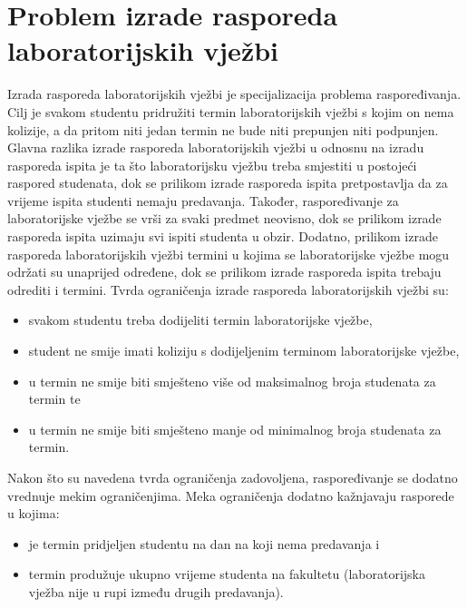 \documentclass[times, utf8, zavrsni]{fer}
\begin{document}
\chapter{Problem izrade rasporeda laboratorijskih vježbi}
Izrada rasporeda laboratorijskih vježbi je specijalizacija problema raspoređivanja. Cilj je svakom studentu pridružiti termin laboratorijskih
vježbi s kojim on nema kolizije, a da pritom niti jedan termin ne bude niti prepunjen niti podpunjen. Glavna razlika izrade rasporeda laboratorijskih
vježbi u odnosnu na izradu rasporeda ispita je ta što laboratorijsku vježbu treba smjestiti u postojeći raspored studenata, dok se prilikom
izrade rasporeda ispita pretpostavlja da za vrijeme ispita studenti nemaju predavanja. Također, raspoređivanje za laboratorijske vježbe se
vrši za svaki predmet neovisno, dok se prilikom izrade rasporeda ispita uzimaju svi ispiti studenta u obzir. Dodatno, prilikom izrade rasporeda
laboratorijskih vježbi termini u kojima se laboratorijske vježbe mogu održati su unaprijed određene, dok se prilikom izrade rasporeda ispita
trebaju odrediti i termini.
Tvrda ograničenja izrade rasporeda laboratorijskih vježbi su:
\begin{itemize}
  \item svakom studentu treba dodijeliti termin laboratorijske vježbe,
  \item student ne smije imati koliziju s dodijeljenim terminom laboratorijske vježbe,
  \item u termin ne smije biti smješteno više od maksimalnog broja studenata za termin te
  \item u termin ne smije biti smješteno manje od minimalnog broja studenata za termin.
\end{itemize}
Nakon što su navedena tvrda ograničenja zadovoljena, raspoređivanje se dodatno vrednuje mekim ograničenjima. Meka ograničenja dodatno kažnjavaju
rasporede u kojima:
\begin{itemize}
  \item je termin pridjeljen studentu na dan na koji nema predavanja i
  \item termin produžuje ukupno vrijeme studenta na fakultetu (laboratorijska vježba nije u rupi između drugih predavanja).
\end{itemize}
\end{document}
